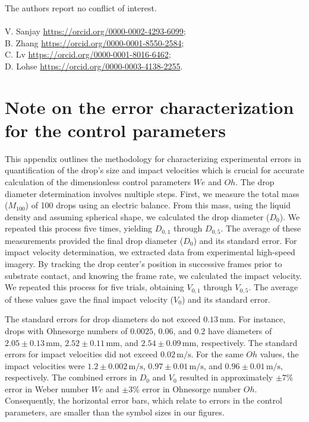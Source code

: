 \documentclass{jfm}
\begin{document}
	 The authors report no conflict of interest.\\
	
	  \\	
	V. Sanjay \href{https://orcid.org/0000-0002-4293-6099}{https://orcid.org/0000-0002-4293-6099};\\
	B. Zhang \href{https://orcid.org/0000-0001-8550-2584}{https://orcid.org/0000-0001-8550-2584};\\	
	C. Lv \href{https://orcid.org/0000-0001-8016-6462}{https://orcid.org/0000-0001-8016-6462};\\
	D. Lohse \href{https://orcid.org/0000-0003-4138-2255}{https://orcid.org/0000-0003-4138-2255}. \\
	
	\appendix
	\renewcommand{\thefigure}{\Alph{section}\,\arabic{figure}}
	\setcounter{figure}{0}
	
	
	\section{Note on the error characterization for the control parameters}
	\label{app:error}
	
	This appendix outlines the methodology for characterizing experimental errors in quantification of the drop's size and impact velocities which is crucial for accurate calculation of the dimensionless control parameters $We$ and $Oh$.
	The drop diameter determination involves multiple steps. First, we measure the total mass ($M_{100}$) of 100 drops using an electric balance. From this mass, using the liquid density and assuming spherical shape, we calculated the drop diameter ($D_0$). 
	We repeated this process five times, yielding $D_{0,1}$ through $D_{0,5}$. The average of these measurements provided the final drop diameter ($D_0$) and its standard error.
	For impact velocity determination, we extracted data from experimental high-speed imagery. By tracking the drop center's position in successive frames prior to substrate contact, and knowing the frame rate, we calculated the impact velocity. We repeated this process for five trials, obtaining $V_{0,1}$ through $V_{0,5}$. The average of these values gave the final impact velocity ($V_0$) and its standard error.
	
	The standard errors for drop diameters do not exceed $0.13\,\si{\milli\meter}$. For instance, drops with Ohnesorge numbers of $0.0025$, $0.06$, and $0.2$ have diameters of $2.05 \pm 0.13\,\si{\milli\meter}$, $2.52 \pm 0.11\,\si{\milli\meter}$, and $2.54 \pm 0.09\,\si{\milli\meter}$, respectively. 
	The standard errors for impact velocities did not exceed $0.02\,\si{\meter}/\si{\second}$. For the same $Oh$ values, the impact velocities were $1.2 \pm 0.002\,\si{\meter}/\si{\second}$, $0.97 \pm 0.01\,\si{\meter}/\si{\second}$, and $0.96 \pm 0.01\,\si{\meter}/\si{\second}$, respectively.
	The combined errors in $D_0$ and $V_0$ resulted in approximately $\pm 7\%$ error in Weber number $We$ and $\pm 3\%$ error in Ohnesorge number $Oh$. Consequently, the horizontal error bars, which relate to errors in the control parameters, are smaller than the symbol sizes in our figures.
	
\end{document}
